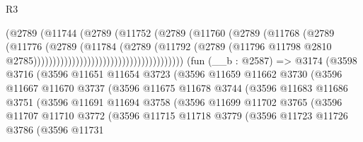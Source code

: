 \begin{lexlean}{R3}
\begin{coremodule}
                                                  (@2789
                                                    (@11744
                                                      (@2789
                                                        (@11752
                                                          (@2789
                                                            (@11760
                                                              (@2789
                                                                (@11768
                                                                  (@2789
                                                                    (@11776
                                                                      (@2789
                                                                        (@11784
                                                                          (@2789
                                                                            (@11792
                                                                              (@2789
                                                                                (@11796
                                                                                  @11798
                                                                                  @2810
                                                                                  @2785)))))))))))))))))))))))))))))))))))))))
    (fun (__b : @2587) =>
    @3174
      (@3598
        @3716
        (@3596
          @11651
          @11654
          @3723
          (@3596
            @11659
            @11662
            @3730
            (@3596
              @11667
              @11670
              @3737
              (@3596
                @11675
                @11678
                @3744
                (@3596
                  @11683
                  @11686
                  @3751
                  (@3596
                    @11691
                    @11694
                    @3758
                    (@3596
                      @11699
                      @11702
                      @3765
                      (@3596
                        @11707
                        @11710
                        @3772
                        (@3596
                          @11715
                          @11718
                          @3779
                          (@3596
                            @11723
                            @11726
                            @3786
                            (@3596
                              @11731

\end{coremodule}
\end{lexlean}
